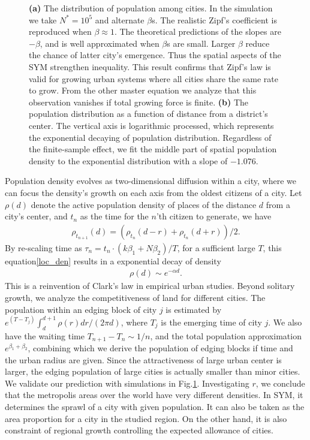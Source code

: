 \documentclass[reprint,unsortedaddress,amsmath,amssymb,aps,prl,showkeys]{revtex4-2}
\begin{document}
\begin{figure}[t]
{\begin{minipage}[t]{0.98\linewidth}
		\label{fig:clark}
	\end{minipage}%
}
	\caption{\textbf{(a)} The distribution of population among cities. In the simulation we take $N^* = 10^5$ and alternate $\beta$s. The realistic Zipf's coefficient is reproduced when $\beta\approx 1$. The theoretical predictions of the slopes are $-\beta$, and is well approximated when $\beta$s are small. Larger $\beta$ reduce the chance of latter city's emergence. Thus the spatial aspects of the SYM strengthen inequality. This result confirms that Zipf's law is valid for growing urban systems where all cities share the same rate to grow. From the other master equation we analyze that this observation vanishes if total growing force is finite. \textbf{(b)} The population distribution as a function of distance from a district's center. The vertical axis is logarithmic processed, which represents the exponential decaying of population distribution. Regardless of the finite-sample effect, we fit the middle part of spatial population density to the exponential distribution with a slope of $-1.076$.}
\end{figure}


Population density evolves as two-dimensional diffusion within a city\cite{doi:10.1137/0150099}, where we can focus the density's growth on each axis from the oldest citizens of a city. Let $\rho(d)$ denote the active population density of places of the distance $d$ from a city's center, and $t_n$ as the time for the $n$'th citizen to generate, we have 
\begin{align}
	\rho_{t_{n+1}}(d) = (\rho_{t_{n}}(d-r) + \rho_{t_{n}}(d+r) )/2.\label{loc_den}  
\end{align} By re-scaling time as $\tau_n = t_n\cdot (k\beta_1+N\beta_2)/T$, for a sufficient large $T$, this equation\@\ref{loc_den} results in a exponential decay of density
\begin{align}
	\rho(d)\sim e^{-\alpha d}\label{clark_eq}.
\end{align}
This is a reinvention of Clark's law in empirical urban studies\cite{clark1951urban}. Beyond solitary growth, we analyze the competitiveness of land for different cities. The population within an edging block of city $j$ is estimated by $e^{(T-T_j)}\int_{d}^{d+1}\rho(r)dr/(2\pi d)$, where $T_j$ is the emerging time of city $j$. We also have the waiting time $T_{n+1}-T_{n}\sim 1/n$, and the total population approximation $e^{\beta_1+\beta_2}$, combining which we derive the population of edging blocks if time and the urban radius are given. Since the attractiveness of large urban center is larger, the edging population of large cities is actually smaller than minor cities. We validate our prediction with simulations in Fig.\@\ref{fig:clark}. %
Investigating $r$, we conclude that the metropolis areas over the world have very different densities. In SYM, it determines the sprawl of a city with given population. It can also be taken as the area proportion for a city in the studied region. On the other hand, it is also constraint of regional growth controlling the expected allowance of cities. 
\end{document}
